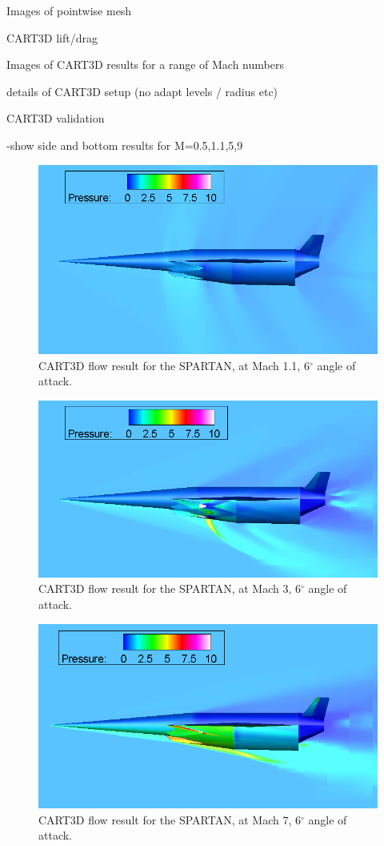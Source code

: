 Images of pointwise mesh

CART3D lift/drag 

Images of CART3D results for a range of Mach numbers

details of CART3D setup (no adapt levels / radius etc)

CART3D validation

-show side and bottom results for M=0.5,1.1,5,9

\begin{figure}
	\centering
	\includegraphics[width=0.7\linewidth]{figures/3_vehicle_design/M1p1AoA6}
	\caption{CART3D flow result for the SPARTAN, at Mach 1.1, 6$^\circ$ angle of attack.}
	\label{fig:M1}
\end{figure}
\begin{figure}
	\centering
	\includegraphics[width=0.7\linewidth]{figures/3_vehicle_design/M3AoA6}
	\caption{CART3D flow result for the SPARTAN, at Mach 3, 6$^\circ$ angle of attack.}
	\label{fig:M3AoA6}
\end{figure}
\begin{figure}
	\centering
	\includegraphics[width=0.7\linewidth]{figures/3_vehicle_design/M7AoA6}
	\caption{CART3D flow result for the SPARTAN, at Mach 7, 6$^\circ$ angle of attack.}
	\label{fig:M7AoA6}
\end{figure}


